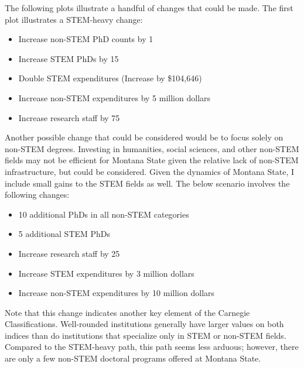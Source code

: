 \documentclass{article}
\begin{document}
The following plots illustrate a handful of changes that could be made. The first plot illustrates a STEM-heavy change:
\begin{itemize}
\item Increase non-STEM PhD counts by 1 
\item Increase STEM PhDs by 15
\item Double STEM expenditures (Increase by \$104,646)
\item Increase non-STEM expenditures by 5 million dollars
\item Increase research staff by 75
\end{itemize}


  
  Another possible change that could be considered would be to focus solely on non-STEM degrees. Investing in humanities, social sciences, and other non-STEM fields may not be efficient for Montana State given the relative lack of non-STEM infrastructure, but could be considered. Given the dynamics of Montana State, I include small gains to the STEM fields as well. The below scenario involves the following changes:\\
  \begin{itemize}
  \item 10 additional PhDs in all non-STEM categories
  \item 5 additional STEM PhDs
  \item Increase research staff by 25
  \item Increase STEM expenditures by 3 million dollars
  \item Increase non-STEM expenditures by 10 million dollars
  \end{itemize}
  
  Note that this change indicates another key element of the Carnegie Classifications. Well-rounded institutions generally have larger values on both indices than do institutions that specialize only in STEM or non-STEM fields. Compared to the STEM-heavy path, this path seems less arduous; however, there are only a few non-STEM doctoral programs offered at Montana State.   
  
\end{document}

